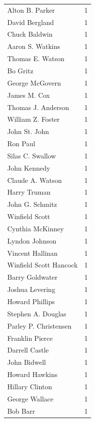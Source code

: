 \documentclass[
  letterpaper,
  DIV=11,
  numbers=noendperiod]{scrreprt}
\begin{document}
\begin{tabular}{lr}
Alton B. Parker        &          1 \\
David Bergland         &          1 \\
Chuck Baldwin          &          1 \\
Aaron S. Watkins       &          1 \\
Thomas E. Watson       &          1 \\
Bo Gritz               &          1 \\
George McGovern        &          1 \\
James M. Cox           &          1 \\
Thomas J. Anderson     &          1 \\
William Z. Foster      &          1 \\
John St. John          &          1 \\
Ron Paul               &          1 \\
Silas C. Swallow       &          1 \\
John Kennedy           &          1 \\
Claude A. Watson       &          1 \\
Harry Truman           &          1 \\
John G. Schmitz        &          1 \\
Winfield Scott         &          1 \\
Cynthia McKinney       &          1 \\
Lyndon Johnson         &          1 \\
Vincent Hallinan       &          1 \\
Winfield Scott Hancock &          1 \\
Barry Goldwater        &          1 \\
Joshua Levering        &          1 \\
Howard Phillips        &          1 \\
Stephen A. Douglas     &          1 \\
Parley P. Christensen  &          1 \\
Franklin Pierce        &          1 \\
Darrell Castle         &          1 \\
John Bidwell           &          1 \\
Howard Hawkins         &          1 \\
Hillary Clinton        &          1 \\
George Wallace         &          1 \\
Bob Barr               &          1 \\
\bottomrule
\end{tabular}
\end{document}
